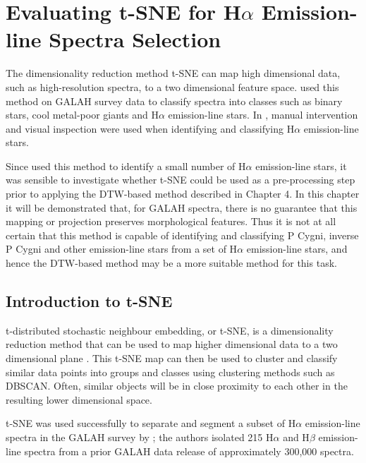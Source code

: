 \chapter{Evaluating t-SNE for H$\alpha$ Emission-line Spectra Selection}

The dimensionality reduction method t-SNE can map high dimensional data, such as high-resolution spectra, to a two dimensional feature space. \citet{traven2017galah} used this method on GALAH survey data to classify spectra into classes such as binary stars, cool metal-poor giants and H$\alpha$ emission-line stars. In \citet{traven2017galah}, manual intervention and visual inspection were used when identifying and classifying H$\alpha$ emission-line stars.

Since  used this method to identify a small number of H$\alpha$ emission-line stars, it was sensible to investigate whether t-SNE could be used as a pre-processing step prior to applying the DTW-based method described in Chapter 4. In this chapter it will be demonstrated that, for GALAH spectra, there is no guarantee that this mapping or projection preserves morphological features. Thus it is not at all certain that this method is capable of identifying and classifying P Cygni, inverse P Cygni and other emission-line stars from a set of H$\alpha$ emission-line stars, and hence the DTW-based method may be a more suitable method for this task.

\section{Introduction to t-SNE}

t-distributed stochastic neighbour embedding, or t-SNE, is a dimensionality reduction method that can be used to map higher dimensional data to a two dimensional plane \citep{van2008visualizing} . This t-SNE map can then be used to cluster and classify similar data points into groups and classes using clustering methods such as DBSCAN. Often, similar objects will be in close proximity to each other in the resulting lower dimensional space.

t-SNE was used successfully to separate and segment a subset of H$\alpha$ emission-line spectra in the GALAH survey by \citet{traven2017galah}; the authors isolated 215 H$\alpha$ and H$\beta$ emission-line spectra from a prior GALAH data release of approximately 300,000 spectra. %


